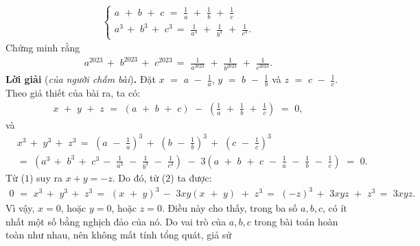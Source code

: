 \begin{multicols}{2}
{	\begin{align*}
		\begin{cases}
			a\,\, + \,\,b\,\, + \,\,c\,\, = \,\,\frac{1}{a}\,\, + \,\,\frac{1}{b}\,\, + \,\,\frac{1}{c}\\
			{a^3}\, + \,\,{b^3}\, + \,\,{c^3}\, = \,\,\frac{1}{{{a^3}}}\,\, + \,\,\frac{1}{{{b^3}}}\,\, + \,\,\frac{1}{{{c^3}}}.
		\end{cases}
	\end{align*}
	Chứng minh rằng
	\begin{align*}
		{a^{2023}}\, + \,\,{b^{2023}}\, + \,\,{c^{2023}}\, = \,\,\frac{1}{{{a^{2023}}}}\,\, + \,\,\frac{1}{{{b^{2023}}}}\,\, + \,\,\frac{1}{{{c^{2023}}}}.
	\end{align*}
	\textbf{Lời giải} (\textit{của người chấm bài})\textbf{.}
	\vskip 0.05cm
	Đặt $x\,\, = \,\,a\,\, - \,\,\frac{1}{a}$, $y\,\, = \,\,b\,\, - \,\,\frac{1}{b}$  và $z\,\, = \,\,c\,\, - \,\,\frac{1}{c}$.
	\vskip 0.05cm
	Theo giả thiết của bài ra, ta có:
	\begin{align*}
		x\,\, + \,\,y\,\, + \,\,z\,\, = \,\,\left( {a\,\, + \,\,b\,\, + \,\,c} \right)\,\, - \,\,\left( {\frac{1}{a}\,\, + \,\,\frac{1}{b}\,\, + \,\,\frac{1}{c}} \right)\,\, = \,\,0, \tag{$1$}
	\end{align*}
	và
	\begin{align*}
		&{x^3}\, + \,\,{y^3}\, + \,\,{z^3}\, = \,\,{\left( {a\,\, - \,\,\frac{1}{a}} \right)^3}\, + \,\,{\left( {b\,\, - \,\,\frac{1}{b}} \right)^3}\, + \,\,{\left( {c\,\, - \,\,\frac{1}{c}} \right)^3}\\
		& = \,\,\left( {{a^3}\, + \,\,{b^3}\, + \,\,{c^3}\, - \,\,\frac{1}{{{a^3}}}\,\, - \,\,\frac{1}{{{b^3}}}\,\, - \,\,\frac{1}{{{c^3}}}} \right)\,\, - \,\,3\left( {a\,\, + \,\,b\,\, + \,\,c\,\, - \,\,\frac{1}{a}\,\, - \,\,\frac{1}{b}\,\, - \,\,\frac{1}{c}} \right)\,\, = \,\,0.\tag{$2$}
	\end{align*}
	Từ ($1$) suy ra $x + y = -z$. Do đó, từ ($2$) ta được:
	\begin{align*}
		0\,\, = \,\,{x^3}\, + \,\,{y^3}\, + \,\,{z^3}\, = \,\,{\left( {x\,\, + \,\,y} \right)^3}\, - \,\,3xy\left( {x\,\, + \,\,y} \right)\,\, + \,\,{z^3}\, = \,\,{\left( { - z} \right)^3}\, + \,\,3xyz\,\, + \,\,{z^3}\, = \,\,3xyz.
	\end{align*}
	Vì vậy, $x = 0$, hoặc $y = 0$, hoặc $z = 0$. Điều này cho thấy, trong ba số $a, b, c$, có ít nhất một số bằng nghịch đảo của nó.
	\vskip 0.05cm
	Do vai trò của $a, b, c$ trong bài toán hoàn toàn như nhau, nên không mất tính tổng quát, giả sử
	\begin{align*}

\end{align*}}
\end{multicols}
